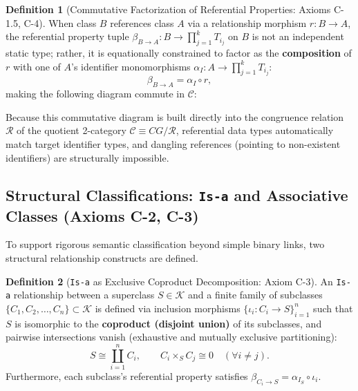\documentclass[11pt,a4paper]{article}
\theoremstyle{definition}
\newtheorem{definition}{Definition}[section]
\theoremstyle{plain}
\theoremstyle{remark}
\begin{document}
\begin{definition}[Commutative Factorization of Referential Properties: Axioms C-1.5, C-4]\label{def:ref-prop}
When class $B$ references class $A$ via a relationship morphism $r : B \to A$, the referential property tuple $\beta_{B \to A} : B \to \prod_{j=1}^k T_{i_j}$ on $B$ is not an independent static type; rather, it is equationally constrained to factor as the \textbf{composition} of $r$ with one of $A$'s identifier monomorphisms $\alpha_I : A \to \prod_{j=1}^k T_{i_j}$:
\begin{equation}
\beta_{B \to A} = \alpha_I \circ r,
\end{equation}
making the following diagram commute in $\mathcal{C}$:
\begin{center}
\end{center}
\end{definition}

Because this commutative diagram is built directly into the congruence relation $\mathcal{R}$ of the quotient 2-category $\mathcal{C} \equiv CG/\mathcal{R}$, referential data types automatically match target identifier types, and dangling references (pointing to non-existent identifiers) are structurally impossible.

\subsection{Structural Classifications: \texttt{Is-a} and Associative Classes (Axioms C-2, C-3)}
To support rigorous semantic classification beyond simple binary links, two structural relationship constructs are defined.

\begin{definition}[\texttt{Is-a} as Exclusive Coproduct Decomposition: Axiom C-3]\label{def:isa}
An \texttt{Is-a} relationship between a superclass $S \in \mathcal{K}$ and a finite family of subclasses $\{C_1, C_2, \dots, C_n\} \subset \mathcal{K}$ is defined via inclusion morphisms $\{\iota_i : C_i \to S\}_{i=1}^n$ such that $S$ is isomorphic to the \textbf{coproduct (disjoint union)} of its subclasses, and pairwise intersections vanish (exhaustive and mutually exclusive partitioning):
\begin{equation}
S \cong \coprod_{i=1}^n C_i, \qquad C_i \times_S C_j \cong 0 \quad (\forall i \neq j).
\end{equation}
Furthermore, each subclass's referential property satisfies $\beta_{C_i \to S} = \alpha_{I_S} \circ \iota_i$.
\end{definition}
\end{document}
